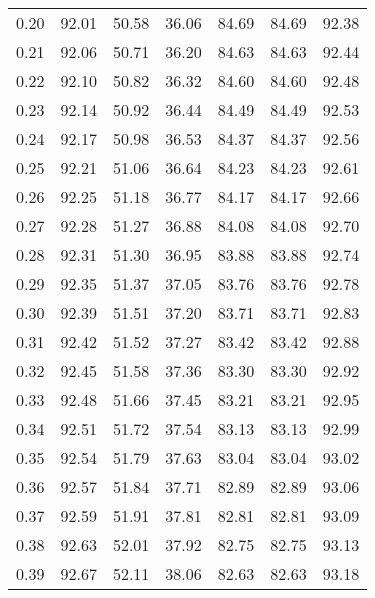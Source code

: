 \begin{tabular}{|c|c|c|c|c|c|c|}
      0.20 &     92.01 &     50.58 &      36.06 &   84.69 &      84.69 &         92.38 \\
      0.21 &     92.06 &     50.71 &      36.20 &   84.63 &      84.63 &         92.44 \\
      0.22 &     92.10 &     50.82 &      36.32 &   84.60 &      84.60 &         92.48 \\
      0.23 &     92.14 &     50.92 &      36.44 &   84.49 &      84.49 &         92.53 \\
      0.24 &     92.17 &     50.98 &      36.53 &   84.37 &      84.37 &         92.56 \\
      0.25 &     92.21 &     51.06 &      36.64 &   84.23 &      84.23 &         92.61 \\
      0.26 &     92.25 &     51.18 &      36.77 &   84.17 &      84.17 &         92.66 \\
      0.27 &     92.28 &     51.27 &      36.88 &   84.08 &      84.08 &         92.70 \\
      0.28 &     92.31 &     51.30 &      36.95 &   83.88 &      83.88 &         92.74 \\
      0.29 &     92.35 &     51.37 &      37.05 &   83.76 &      83.76 &         92.78 \\
      0.30 &     92.39 &     51.51 &      37.20 &   83.71 &      83.71 &         92.83 \\
      0.31 &     92.42 &     51.52 &      37.27 &   83.42 &      83.42 &         92.88 \\
      0.32 &     92.45 &     51.58 &      37.36 &   83.30 &      83.30 &         92.92 \\
      0.33 &     92.48 &     51.66 &      37.45 &   83.21 &      83.21 &         92.95 \\
      0.34 &     92.51 &     51.72 &      37.54 &   83.13 &      83.13 &         92.99 \\
      0.35 &     92.54 &     51.79 &      37.63 &   83.04 &      83.04 &         93.02 \\
      0.36 &     92.57 &     51.84 &      37.71 &   82.89 &      82.89 &         93.06 \\
      0.37 &     92.59 &     51.91 &      37.81 &   82.81 &      82.81 &         93.09 \\
      0.38 &     92.63 &     52.01 &      37.92 &   82.75 &      82.75 &         93.13 \\
      0.39 &     92.67 &     52.11 &      38.06 &   82.63 &      82.63 &         93.18 \\

\end{tabular}
